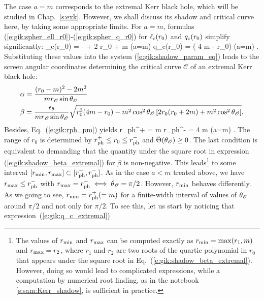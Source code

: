 The case $a=m$ corresponds to the extremal Kerr black hole, which will be
studied in Chap.~\ref{s:exk}. However, we shall discuss its
shadow and critical curve here, by taking some appropriate limits.
For $a=m$, formulas (\ref{e:gik:spher_ell_r0})-(\ref{e:gik:spher_q_r0})
for $\ell_{\rm c}(r_0)$ and $q_{\rm c}(r_0)$ simplify significantly:
\be
    \ell_{\rm c}(r_0) = -  + 2 r_0 + m \qquad (a=m)
\ee
\be \label{e:gik:q_c_extremal}
    q_{\rm c}(r_0) =  ( 4 m - r_0) \qquad (a=m) .
\ee
Substituting these values into the system (\ref{e:gik:shadow_param_eq}) leads to
the screen angular coordinates determining the critical curve $\mathscr{C}$
of an extremal Kerr black hole:
\begin{subequations}
\label{e:gik:shadow_param_extremal}
\begin{align}
& \alpha =  \frac{(r_0 - m)^2 - 2 m^2}{m r_{\mathscr{O}}\sin\theta_{\mathscr{O}}}  \label{e:gik:shadow_alpha_extremal} \\
& \beta = \frac{\epsilon_\theta}{m r_{\mathscr{O}} \sin\theta_{\mathscr{O}}}
        \sqrt{ r_0^3 (4 m - r_0) - m^2 \cos^2\theta_{\mathscr{O}} \left[ 2 r_0(r_0 + 2 m)
                + m^2\cos^2\theta_{\mathscr{O}}\right] } . \label{e:gik:shadow_beta_extremal}
\end{align}
\end{subequations}
Besides, Eq.~(\ref{e:gik:rph_pm}) yields
\be
    r_{\rm ph}^+ = m \qand r_{\rm ph}^- = 4 m \qquad (a=m) .
\ee
The range of $r_0$ is determined by $r_{\rm ph}^+ \leq r_0 \leq r_{\rm ph}^-$ and
$\tilde{\Theta}(\theta_{\mathscr{O}}) \geq 0$. The last condition is equivalent to demanding that
the quantity under the square root in expression (\ref{e:gik:shadow_beta_extremal}) for $\beta$
is non-negative. This leads\footnote{The values of $r_{\rm min}$ and $r_{\rm max}$
can be computed exactly as $r_{\rm min} = \max(r_1, m)$ and $r_{\rm max} = r_2$,
where $r_1$ and $r_2$ are two roots of the quartic polynomial in $r_0$ that appears
under the square root in Eq.~(\ref{e:gik:shadow_beta_extremal}). However, doing so would
lead to complicated expressions, while a computation by numerical root finding, as in
the notebook \ref{s:sam:Kerr_shadow}, is sufficient in practice.} to some interval $[r_{\rm min}, r_{\rm max}] \subset [r_{\rm ph}^+, r_{\rm ph}^-]$.
As in the case $a<m$ treated above, we have $r_{\rm max} \leq r_{\rm ph}^-$
with $r_{\rm max} = r_{\rm ph}^- \iff \theta_{\mathscr{O}} = \pi/2$.
However, $r_{\rm min}$ behaves differently. As we going to see,
$r_{\rm min} = r_{\rm ph}^+ (= m)$ for a finite-width interval of values of $\theta_{\mathscr{O}}$ around $\pi/2$
and not only for $\pi/2$. To see this, let us start by noticing that expression~(\ref{e:gik:q_c_extremal})

